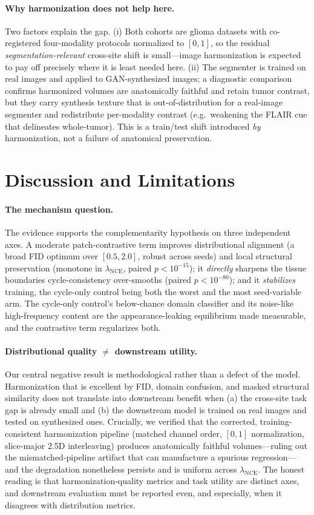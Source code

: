 \documentclass[runningheads]{llncs}
\begin{document}
\paragraph{Why harmonization does not help here.}
Two factors explain the gap. (i) Both cohorts are glioma datasets with
co-registered four-modality protocols normalized to $[0,1]$, so the residual
\emph{segmentation-relevant} cross-site shift is small---image harmonization is
expected to pay off precisely where it is least needed here. (ii) The segmenter is
trained on real images and applied to GAN-synthesized images; a diagnostic
comparison confirms harmonized volumes are anatomically faithful and retain tumor
contrast, but they carry synthesis texture that is out-of-distribution for a
real-image segmenter and redistribute per-modality contrast (e.g.\ weakening the
FLAIR cue that delineates whole-tumor). This is a train/test shift introduced
\emph{by} harmonization, not a failure of anatomical preservation.

\section{Discussion and Limitations}
\label{sec:discuss}
\paragraph{The mechanism question.}
The evidence supports the complementarity hypothesis on three independent axes. A
moderate patch-contrastive term improves distributional alignment (a broad FID
optimum over $[0.5,2.0]$, robust across seeds) and local structural preservation
(monotone in $\lambda_{\mathrm{NCE}}$, paired $p{<}10^{-15}$); it \emph{directly}
sharpens the tissue boundaries cycle-consistency over-smooths (paired
$p{<}10^{-80}$); and it \emph{stabilizes} training, the cycle-only control being
both the worst and the most seed-variable arm. The cycle-only control's
below-chance domain classifier and its noise-like high-frequency content are the
appearance-leaking equilibrium made measurable, and the contrastive term
regularizes both.

\paragraph{Distributional quality $\ne$ downstream utility.}
Our central negative result is methodological rather than a defect of the model.
Harmonization that is excellent by FID, domain confusion, and masked structural
similarity does not translate into downstream benefit when (a) the cross-site task
gap is already small and (b) the downstream model is trained on real images and
tested on synthesized ones. Crucially, we verified that the corrected,
training-consistent harmonization pipeline (matched channel order, $[0,1]$
normalization, slice-major 2.5D interleaving) produces anatomically faithful
volumes---ruling out the mismatched-pipeline artifact that can manufacture a
spurious regression---and the degradation nonetheless persists and is uniform
across $\lambda_{\mathrm{NCE}}$. The honest reading is that harmonization-quality
metrics and task utility are distinct axes, and downstream evaluation must be
reported even, and especially, when it disagrees with distribution metrics.
\end{document}
